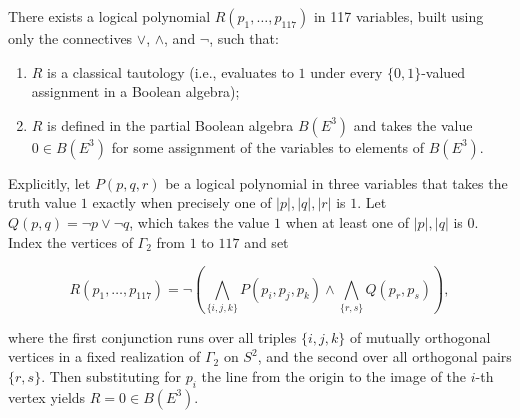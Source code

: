 There exists a logical polynomial $R(p_1, \ldots, p_{117})$ in 117 variables, built using only the connectives $\vee$, $\wedge$, and $\neg$, such that:

\begin{enumerate}
\item[(i)] $R$ is a classical tautology (i.e., evaluates to $1$ under every $\{0, 1\}$-valued assignment in a Boolean algebra);
\item[(ii)] $R$ is defined in the partial Boolean algebra $B(E^3)$ and takes the value $0 \in B(E^3)$ for some assignment of the variables to elements of $B(E^3)$.
\end{enumerate}

Explicitly, let $P(p, q, r)$ be a logical polynomial in three variables that takes the truth value $1$ exactly when precisely one of $|p|, |q|, |r|$ is $1$. Let $Q(p, q) = \neg p \vee \neg q$, which takes the value $1$ when at least one of $|p|, |q|$ is $0$. Index the vertices of $\Gamma_2$ from $1$ to $117$ and set

$$R(p_1, \ldots, p_{117}) = \neg\left( \bigwedge_{\{i, j, k\}} P(p_i, p_j, p_k) \wedge \bigwedge_{\{r, s\}} Q(p_r, p_s) \right),$$

where the first conjunction runs over all triples $\{i, j, k\}$ of mutually orthogonal vertices in a fixed realization of $\Gamma_2$ on $S^2$, and the second over all orthogonal pairs $\{r, s\}$. Then substituting for $p_i$ the line from the origin to the image of the $i$-th vertex yields $R = 0 \in B(E^3)$.

